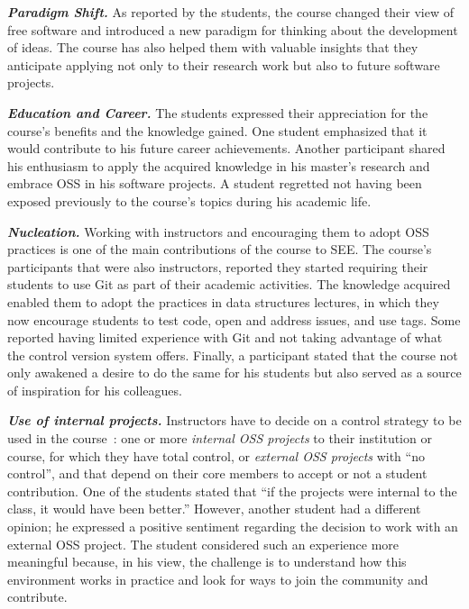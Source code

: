 \documentclass[sigconf]{acmart}
\begin{document}
\textit{\textbf{Paradigm Shift.}} As reported by the students, the course changed their view of free software and introduced a new paradigm for thinking about the development of ideas.  The course has also helped them with valuable insights that they anticipate applying not only to their research work but also to future software projects.

\textit{\textbf{Education and Career.}}
The students expressed their appreciation for the course's benefits and the knowledge gained. One student emphasized that it would contribute to his future career achievements. Another participant shared his enthusiasm to apply the acquired knowledge in his master's research and embrace OSS in his software projects. A student regretted not having been exposed previously to the course's topics during his academic life.


\textit{\textbf{Nucleation.}}
Working with instructors and encouraging them to adopt OSS practices is one of the main contributions of the course to SEE. The course's participants that were also instructors, reported they started requiring their students to use Git as part of their academic activities. The knowledge acquired enabled them to adopt the practices in data structures lectures, in which they now encourage students to test code, open and address issues, and use tags. Some reported having limited experience with Git and not taking advantage of what the control version system offers. Finally, a participant stated that the course not only awakened a desire to do the same for his students but also served as a source of inspiration for his colleagues.


\textit{\textbf{Use of internal projects.}}
Instructors have to decide on a control  strategy to be used in the course~\cite{nascimento:oss:2019}:  one or more
\textit{internal OSS projects} to their institution or course, for which they have total control, or  \textit{external OSS projects} with ``no control'',  and that depend on their core members to accept or not a student contribution.
One of the students stated that ``if the projects were internal to the class, it would have been better.''
%
However, another student had a different opinion; he expressed a positive sentiment regarding the decision to work with an external OSS project. The student considered such an experience more meaningful because, in his view, the challenge is to understand how this environment works in practice and look for ways to join the community and contribute.
\end{document}
